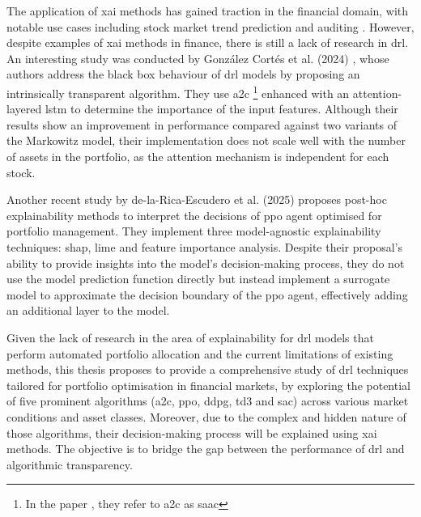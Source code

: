The application of \acrshort{xai} methods has gained traction in the financial domain, with notable use cases including stock market trend prediction \cite{Mandeep2022} and auditing \cite{Zhang2022}. However, despite examples of \acrshort{xai} methods in finance, there is still a lack of research in \acrshort{drl}. An interesting study was conducted by González Cortés et al. (2024) \cite{Cortes2024}, whose authors address the black box behaviour of \acrshort{drl} models by proposing an intrinsically transparent algorithm. They use \acrfull{a2c} \footnote{In the paper \cite{Cortes2024}, they refer to \acrshort{a2c} as \acrfull{saac}} enhanced with an attention-layered \acrshort{lstm} to determine the importance of the input features. Although their results show an improvement in performance compared against two variants of the Markowitz model, their implementation does not scale well with the number of assets in the portfolio, as the attention mechanism is independent for each stock.

Another recent study by de-la-Rica-Escudero et al. (2025) \cite{de-La-Rica-Escudero2025} proposes post-hoc explainability methods to interpret the decisions of \acrshort{ppo} agent optimised for portfolio management. They implement three model-agnostic explainability techniques: \acrshort{shap}, \acrshort{lime} and feature importance analysis. Despite their proposal's ability to provide insights into the model's decision-making process, they do not use the model prediction function directly but instead implement a surrogate model to approximate the decision boundary of the \acrshort{ppo} agent, effectively adding an additional layer to the model.

Given the lack of research in the area of explainability for \acrshort{drl} models that perform automated portfolio allocation and the current limitations of existing methods, this thesis proposes to provide a comprehensive study of  \acrshort{drl} techniques tailored for portfolio optimisation in financial markets, by exploring the potential of five prominent algorithms (\acrshort{a2c}, \acrshort{ppo}, \acrshort{ddpg}, \acrshort{td3} and \acrshort{sac}) across various market conditions and asset classes. Moreover, due to the complex and hidden nature of those algorithms, their decision-making process will be explained using \acrshort{xai} methods. The objective is to bridge the gap between the performance of \acrshort{drl} and algorithmic transparency.